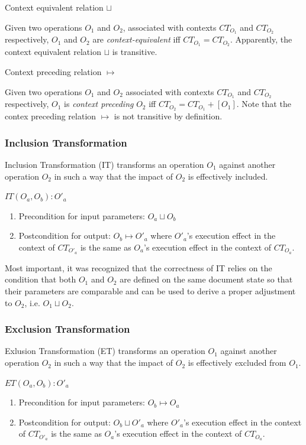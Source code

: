 \documentclass[11pt,a4paper]{article}
\begin{document}
\begin{defn}
Context equivalent relation $\sqcup$
\end{defn}

Given two operations $O_{1}$ and $O_{2}$, associated with contexts $CT_{O_{1}}$ and $CT_{O_{2}}$ respectively, $O_{1}$ and $O_{2}$ are \emph{context-equivalent} iff $CT_{O_{1}}=CT_{O_{2}}$. Apparently, the context equivalent relation $\sqcup$ is transitive.

\begin{defn}
Context preceding relation $\mapsto$
\end{defn}
Given two operations $O_{1}$ and $O_{2}$ associated with contexts $CT_{O_{1}}$ and $CT_{O_{2}}$ respectively, $O_{1}$ is \emph{context preceding} $O_{2}$ iff $CT_{O_{2}}=CT_{O_{1}} + [O_{1}]$. Note that the contex preceding relation $\mapsto$ is not transitive by definition.

\subsubsection{Inclusion Transformation}
\label{sect:it}
Inclusion Transformation (IT) transforms an operation $O_{1}$ against another operation $O_{2}$ in such a way that the impact of $O_{2}$ is effectively included. 
\begin{spec}
$IT(O_a,O_b):O'_a$
\end{spec}
\begin{enumerate}
 \item Precondition for input parameters: $O_a \sqcup O_b$
 \item Postcondition for output: $O_b \mapsto O'_a$ where $O'_a$'s execution effect in the context of $CT_{O'_a}$ is the same as $O_a$'s execution effect in the context of $CT_{O_a}$.
\end{enumerate}

Most important, it was recognized that the correctness of IT relies on the condition that both $O_{1}$ and $O_{2}$ are defined on the same document state so that their parameters are comparable and can be used to derive a proper adjustment to $O_{2}$, i.e. $O_{1} \sqcup O_{2}$.

\subsubsection{Exclusion Transformation}
\label{sect:et}
Exlusion Transformation (ET) transforms an operation $O_{1}$ against another operation $O_{2}$ in such a way that the impact of $O_{2}$ is effectively excluded from $O_{1}$.
\begin{spec}
$ET(O_a,O_b):O'_a$
\end{spec}
\begin{enumerate}
 \item Precondition for input parameters: $O_b \mapsto O_a$
 \item Postcondition for output: $O_b \sqcup O'_a$ where $O'_a$'s execution effect in the context of $CT_{O'_a}$ is the same as $O_a$'s execution effect in the context of $CT_{O_a}$.
\end{enumerate}
\end{document}
